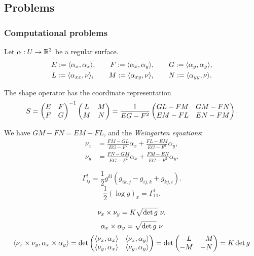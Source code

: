 \documentclass{../exp}
\def\a{\alpha}
\begin{document}






\subsection{Problems}
\subsubsection{Computational problems}

\begin{defn}
Let $\a:U\to\R^3$ be a regular surface.
\begin{gather*}
E:=\<\a_x,\a_x\>,\qquad F:=\<\a_x,\a_y\>,\qquad G:=\<\a_y,\a_y\>,\\
L:=\<\a_{xx},\nu\>,\qquad M:=\<\a_{xy},\nu\>,\qquad N:=\<\a_{yy},\nu\>.
\end{gather*}
\end{defn}


\begin{thm}
The shape operator has the coordinate representation
\[S=\begin{pmatrix}E&F\\F&G\end{pmatrix}^{-1}\begin{pmatrix}L&M\\M&N\end{pmatrix}=\frac1{EG-F^2}\begin{pmatrix}GL-FM&GM-FN\\EM-FL&EN-FM\end{pmatrix}.\]
\end{thm}
\begin{cor}
We have $GM-FN=EM-FL$, and the \emph{Weingarten equations}:
\begin{align*}
\nu_x&=\frac{FM-GL}{EG-F^2}\a_x+\frac{FL-EM}{EG-F^2}\a_y,\\
\nu_y&=\frac{FN-GM}{EG-F^2}\a_x+\frac{FM-EN}{EG-F^2}\a_y.
\end{align*}
\end{cor}






\[\Gamma_{ij}^l=\frac12g^{kl}(g_{ik,j}-g_{ij,k}+g_{kj,i}).\]
\[\frac12(\log g)_x=\Gamma_{11}^1.\]

\[\nu_x\x\nu_y=K\sqrt{\det g}\ \nu.\]
\[\a_x\x\a_y=\sqrt{\det g}\ \nu\]
\[\<\nu_x\x\nu_y,\a_x\x\a_y\>=\det\mat{\<\nu_x,\a_x\>&\<\nu_x,\a_y\>\\\<\nu_y,\a_x\>&\<\nu_y,\a_y\>}=\det\mat{-L&-M\\-M&-N}=K\det g\]
\end{document}
